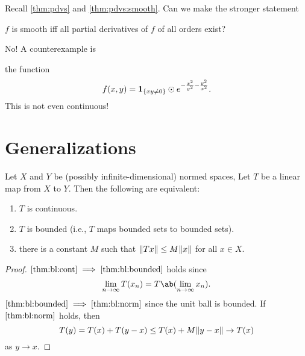 Recall \cref{thm:pdvs} and \cref{thm:pdvs:smooth}.
Can we make the stronger statement

\let\oldthetheorem\thetheorem
\renewcommand{\thetheorem}{\ref*{thm:pdvs:smooth}$'$}
\begin{proposition}
    $f$ is smooth iff all partial derivatives of $f$ of all orders exist?
\end{proposition}
\let\thetheorem\oldthetheorem

No!
A counterexample is
\begin{example}
    the function \[
        f(x, y) = \bm1_{\{xy \ne 0\}}
        \odot e^{-\frac{x^2}{y^2} - \frac{y^2}{x^2}}.
    \] This is not even continuous!
\end{example}

\section{Generalizations} \label{sec:gen}
\begin{proposition} \label{thm:bl}
    Let $X$ and $Y$ be (possibly infinite-dimensional) normed spaces,
    Let $T$ be a linear map from $X$ to $Y$.
    Then the following are equivalent:
    \begin{enumerate}
        \item \label{thm:bl:cont} $T$ is continuous.
        \item \label{thm:bl:bounded}
            $T$ is bounded (i.e., $T$ maps bounded sets to bounded sets).
        \item \label{thm:bl:norm} there is a constant $M$ such that
            $\lVert Tx\rVert \le M \lVert x\rVert$ for all $x \in X$.
    \end{enumerate}
\end{proposition}
\begin{proof}
    $\ref*{thm:bl:cont} \implies \ref*{thm:bl:bounded}$ holds since \[
        \lim_{n \to \infty} T(x_n) = T\ab(\lim_{n \to \infty} x_n).
    \]
    $\ref*{thm:bl:bounded} \implies \ref*{thm:bl:norm}$ since the unit ball
    is bounded.
    If $\ref*{thm:bl:norm}$ holds, then \[
        T(y) = T(x) + T(y - x) \le T(x) + M \lVert y - x\rVert \to T(x)
    \] as $y \to x$.
\end{proof}
